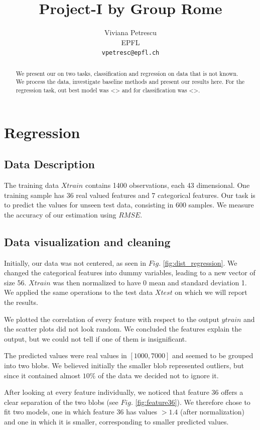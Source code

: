 \documentclass{article} %
\title{Project-I by Group Rome}
\author{
Viviana Petrescu\\
EPFL \\
\texttt{vpetresc@epfl.ch} \\
}
\begin{document}
\maketitle

\begin{abstract}
We present our on two tasks, classification and regression on data that is not known. We process the data, investigate baseline methods and present our results here.
For the regression task, out best model was <> and for classification was <>.
\end{abstract}

\section{Regression}
\subsection{Data Description}
The training data $Xtrain$ contains 1400 observations, each 43 dimensional. One training sample has 36 real valued features and 7 categorical features. Our task is to predict the values for unseen test data, consisting in 600 samples. We measure the accuracy of our estimation using $RMSE$. 

\subsection{Data visualization and cleaning}
Initially, our data was not centered, as seen in $Fig.$ \ref{fig:dist_regression}.
We changed the categorical features into dummy variables, leading to a new vector of size 56. $Xtrain$ was then normalized to have 0 mean and standard deviation 1. We applied the same operations to the test data $Xtest$ on which we will report the results.

 We plotted the correlation of every feature with respect to the output $ytrain$ and the scatter plots did not look random. We concluded the features explain the output, but we could not tell if one of them is insignificant.

The predicted values were real values in $[1000,7000]$ and seemed to be grouped into two blobs. We believed initially the smaller blob represented outliers, but since it contained almost $10\%$ of the data we decided not to ignore it.

After looking at every feature individually, we noticed that feature 36 offers a clear separation of the two blobs (see $Fig.$ \ref{fig:feature36}). We therefore chose to fit two models, one in which feature 36 has values $>1.4$ (after normalization) and one in which it is smaller, corresponding to smaller predicted values. 
\end{document}
